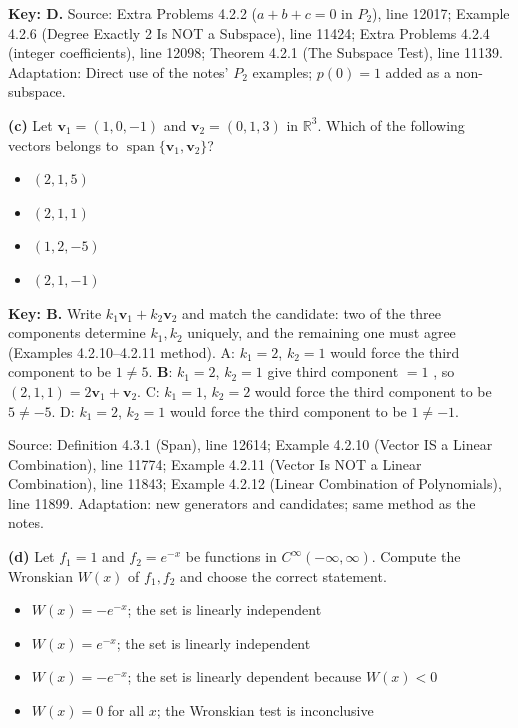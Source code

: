 \documentclass[11pt,a4paper]{article}
\newcommand{\Src}[1]{{\footnotesize\color{black!65}Source: #1}}
\begin{document}
\textbf{Key: D.} \Src{Extra Problems 4.2.2 ($a+b+c=0$ in $P_2$), line 12017; Example 4.2.6 (Degree Exactly 2 Is NOT a Subspace), line 11424; Extra Problems 4.2.4 (integer coefficients), line 12098; Theorem 4.2.1 (The Subspace Test), line 11139. Adaptation: Direct use of the notes' $P_2$ examples; $p(0)=1$ added as a non-subspace.}\par
{}\textbf{(c)} Let $\mathbf{v}_1=(1,0,-1)$ and $\mathbf{v}_2=(0,1,3)$ in $\mathbb{R}^3$. Which of the following vectors belongs to $\operatorname{span}\{\mathbf{v}_1,\mathbf{v}_2\}$?\par
\begin{itemize}[leftmargin=8mm,itemsep=0pt]\item[A] $(2,1,5)$\item[B$^{\ast}$] $(2,1,1)$\item[C] $(1,2,-5)$\item[D] $(2,1,-1)$\end{itemize}
\textbf{Key: B.} Write $k_1\mathbf{v}_1+k_2\mathbf{v}_2$ and match the candidate: two of the three components determine $k_1,k_2$ uniquely, and the remaining one must agree (Examples 4.2.10--4.2.11 method). A: $k_1=2$, $k_2=1$ would force the third component to be $1\neq5$. \textbf{B}: $k_1=2$, $k_2=1$ give third component $=1$ \checkmark, so $(2,1,1)=2\mathbf{v}_1+\mathbf{v}_2$. C: $k_1=1$, $k_2=2$ would force the third component to be $5\neq-5$. D: $k_1=2$, $k_2=1$ would force the third component to be $1\neq-1$.\par
\Src{Definition 4.3.1 (Span), line 12614; Example 4.2.10 (Vector IS a Linear Combination), line 11774; Example 4.2.11 (Vector Is NOT a Linear Combination), line 11843; Example 4.2.12 (Linear Combination of Polynomials), line 11899. Adaptation: new generators and candidates; same method as the notes.}\par
{}\textbf{(d)} Let $f_1=1$ and $f_2=e^{-x}$ be functions in $C^{\infty}(-\infty,\infty)$. Compute the Wronskian $W(x)$ of $f_1,f_2$ and choose the correct statement.\par
\begin{itemize}[leftmargin=8mm,itemsep=0pt]\item[A$^{\ast}$] $W(x)=-e^{-x}$; the set is linearly independent\item[B] $W(x)=e^{-x}$; the set is linearly independent\item[C] $W(x)=-e^{-x}$; the set is linearly dependent because $W(x)<0$\item[D] $W(x)=0$ for all $x$; the Wronskian test is inconclusive\end{itemize}
\end{document}
